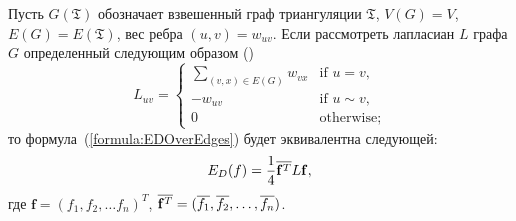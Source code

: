 Пусть $G(\mathfrak{T})$ обозначает взвешенный граф триангуляции $\mathfrak{T}$, $V(G) = V$, $E(G) = E(\mathfrak{T})$, вес ребра $(u, v) = w_{uv}$. 
Если рассмотреть лапласиан $L$ графа $G$ определенный следующим образом (\cite{Chen}) 
$$ L_{uv} = \begin{cases}
  \sum_{(v, x) \in E(G)}{w_{vx}}&\text{if $u = v,$} \\
  -w_{uv}&\text{if $u \sim v,$} \\
  0 &\text{otherwise;}
\end{cases}
$$ то формула~(\ref{formula:EDOverEdges}) будет эквивалентна следующей:
\begin{equation}
  \label{formula:EDOverLaplacian}
  E_D(f) = \frac{1}{4} \overline{\mathbf{f}^T} L \mathbf{f},
\end{equation}
где $\mathbf{f} = (f_1, f_2, \dots f_n)^T$, $\overline{\mathbf{f}^T} = (\overline{f_1}, \overline{f_2}, \dots, \overline{f_n})$.


